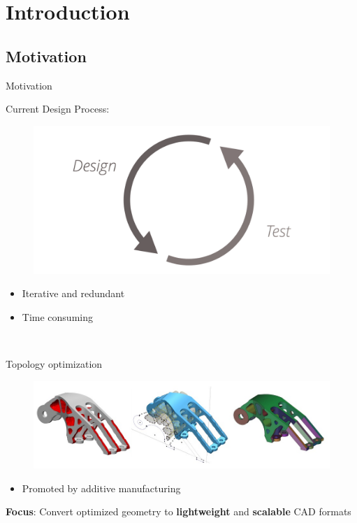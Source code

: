 \section{Introduction}
\subsection{Motivation}



\begin{frame}{Motivation}
\begin{multicols}{2}
Current Design Process:
\begin{figure}
\includegraphics[width=0.8\linewidth]{Pictures/Motivation/DesignTest.png}
\end{figure}
\begin{itemize}
\item Iterative and redundant
\item Time consuming
\end{itemize}~\\

\vfill
\columnbreak

\pause

Topology optimization
\begin{figure}
\includegraphics[width=0.9\linewidth]{Pictures/Motivation/TopOpt.jpg}
\end{figure}
\begin{itemize}
\item Promoted by additive manufacturing
\end{itemize}


\pause
\end{multicols}
\begin{tcolorbox}
\textbf{Focus}: Convert optimized geometry to \textbf{lightweight} and \textbf{scalable} CAD formats
\end{tcolorbox}

\end{frame}


